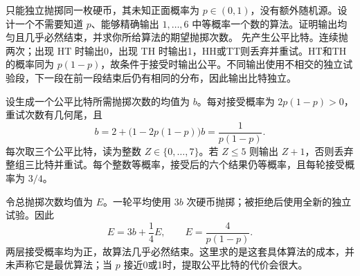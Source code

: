只能独立抛掷同一枚硬币，其未知正面概率为 $p\in(0,1)$，没有额外随机源。设计一个不需要知道 $p$、能够精确输出 $1,\ldots,6$ 中等概率一个数的算法。证明输出均匀且几乎必然结束，并求你所给算法的期望抛掷次数。
\solution 先产生公平比特。连续抛两次；出现 HT 时输出0，出现 TH 时输出1，HH或TT则丢弃并重试。HT和TH的概率同为 $p(1-p)$，故条件于接受时输出公平。不同输出使用不相交的独立试验段，下一段在前一段结束后仍有相同的分布，因此输出比特独立。

设生成一个公平比特所需抛掷次数的均值为 $b$。每对接受概率为 $2p(1-p)>0$，重试次数有几何尾，且
\[
b=2+\bigl(1-2p(1-p)\bigr)b
  =\frac1{p(1-p)}.
\]
每次取三个公平比特，读为整数 $Z\in\{0,\ldots,7\}$。若 $Z\le5$ 则输出 $Z+1$，否则丢弃整组三比特并重试。每个整数等概率，接受后的六个结果仍等概率，且每轮接受概率为 $3/4$。

令总抛掷次数均值为 $E$。一轮平均使用 $3b$ 次硬币抛掷；被拒绝后使用全新的独立试验。因此
\[
E=3b+\frac14E,\qquad
\boxed{E=\frac4{p(1-p)}}.
\]
两层接受概率均为正，故算法几乎必然结束。这里求的是这套具体算法的成本，并未声称它是最优算法；当 $p$ 接近0或1时，提取公平比特的代价会很大。
